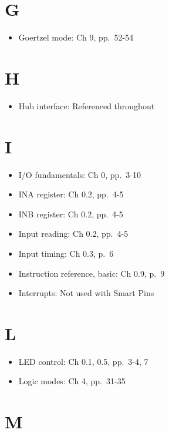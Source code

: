 \documentclass[11pt,a4paper,oneside,english]{book}
\begin{document}
\hypertarget{g}{%
\section{G}\label{g}}

\begin{itemize}
\tightlist
\item
  Goertzel mode: Ch 9, pp.~52-54
\end{itemize}

\hypertarget{h}{%
\section{H}\label{h}}

\begin{itemize}
\tightlist
\item
  Hub interface: Referenced throughout
\end{itemize}

\hypertarget{i}{%
\section{I}\label{i}}

\begin{itemize}
\tightlist
\item
  I/O fundamentals: Ch 0, pp.~3-10
\item
  INA register: Ch 0.2, pp.~4-5
\item
  INB register: Ch 0.2, pp.~4-5
\item
  Input reading: Ch 0.2, pp.~4-5
\item
  Input timing: Ch 0.3, p.~6
\item
  Instruction reference, basic: Ch 0.9, p.~9
\item
  Interrupts: Not used with Smart Pins
\end{itemize}

\hypertarget{l}{%
\section{L}\label{l}}

\begin{itemize}
\tightlist
\item
  LED control: Ch 0.1, 0.5, pp.~3-4, 7
\item
  Logic modes: Ch 4, pp.~31-35
\end{itemize}

\hypertarget{m}{%
\section{M}\label{m}}
\end{document}
